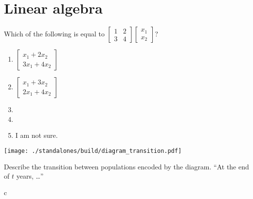 \documentclass[t, 14pt]{beamer}
\begin{document}
\section{Linear algebra}

\begin{frame}
  Which of the following is equal to \(\begin{bmatrix} 1 & 2 \\ 3 & 4 \end{bmatrix} \begin{bmatrix}x_{1} \\ x_{2}\end{bmatrix}\)?
  \begin{multicols}{2}
    \begin{enumerate}
      \item \(\begin{bmatrix} x_{1} + 2 x_{2} \\ 3x_{1} + 4x_{2} \end{bmatrix}\)
      \item \(\begin{bmatrix} x_{1} + 3 x_{2} \\ 2x_{1} + 4x_{2} \end{bmatrix}\)
      \item 
      \item 
      \item I am not sure.
    \end{enumerate}
  \end{multicols}
\end{frame}


\begin{frame}[c]
  \begin{center}
    \texttt{[image: ./standalones/build/diagram\_transition.pdf]}
  \end{center}

  Describe the transition between populations encoded by the diagram. ``At the end of \(t\) years, \ldots{}''
\end{frame}

\begin{frame}{c}
\end{frame}
\end{document}

